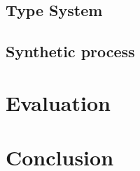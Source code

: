 \documentclass[10pt, a4paper, titlepage]{article}
\begin{document}
  \subsection{Type System}
  \subsection{Synthetic process}

\section{Evaluation} %

\section{Conclusion} %



\end{document}
